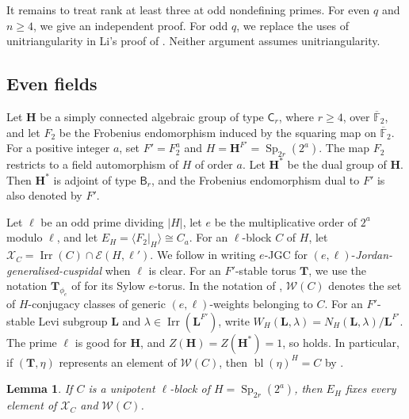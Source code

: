 \documentclass[10pt]{amsart}
\newtheorem{lemma}[theorem]{Lemma}
\theoremstyle{definition}
\renewcommand{\geq}{\geqslant}
\DeclareMathOperator{\Irr}{Irr}
\DeclareMathOperator{\Sp}{Sp}
\DeclareMathOperator{\bl}{bl}
\newcommand{\F}{\mathbb F}
\numberwithin{equation}{section}
\numberwithin{table}{section}
\begin{document}
It remains to treat rank at least three at odd nondefining primes.
For even $q$ and $n\geq4$, we give an independent proof. For odd $q$, we replace the
uses of unitriangularity in Li's proof of \cite[Theorem~2]{Li2021}.
Neither argument assumes unitriangularity.

\subsection{Even fields}

Let $\mathbf H$ be a simply connected algebraic group of type $\mathsf C_r$,
where $r\geq4$, over $\overline{\F}_2$, and let $F_2$ be the Frobenius
endomorphism induced by the squaring map on $\overline{\F}_2$.  For a
positive integer $a$, set $F'=F_2^a$ and
$H=\mathbf H^{F'}=\Sp_{2r}(2^a)$.  The map $F_2$ restricts to a field
automorphism of $H$ of order $a$.  Let $\mathbf H^*$ be the dual group of
$\mathbf H$.  Then $\mathbf H^*$ is adjoint of type $\mathsf B_r$, and the
Frobenius endomorphism dual to $F'$ is also denoted by $F'$.

Let $\ell$ be an odd prime dividing $|H|$, let $e$ be the
multiplicative order of $2^a$ modulo $\ell$, and let
$E_H=\langle F_2|_H\rangle\cong C_a$.  For an $\ell$-block $C$ of $H$, let
$\mathcal X_C=\Irr(C)\cap\mathcal E(H,\ell')$.  We follow
\cite[Definition~3.5]{FengMalleZhang2026} in writing $e$-JGC for
$(e,\ell)$-\emph{Jordan-generalised-cuspidal} when $\ell$ is clear.
For an $F'$-stable torus $\mathbf T$, we use the notation
$\mathbf T_{\phi_e}$ of \cite[Section~3.2]{FengMalleZhang2026} for its
Sylow $e$-torus.  In the notation of
\cite[Definitions~3.17--3.18]{FengMalleZhang2026}, $\mathcal W(C)$ denotes
the set of $H$-conjugacy classes of generic $(e,\ell)$-weights belonging
to $C$.
For an $F'$-stable Levi subgroup $\mathbf L$ and
$\lambda\in\Irr(\mathbf L^{F'})$, write
$W_H(\mathbf L,\lambda)=N_H(\mathbf L,\lambda)/\mathbf L^{F'}$.
The prime $\ell$ is good for $\mathbf H$, and
$Z(\mathbf H)=Z(\mathbf H^*)=1$, so
\cite[Condition~3.23]{FengMalleZhang2026} holds.
In particular, if $(\mathbf T,\eta)$ represents an element of
$\mathcal W(C)$, then $\bl(\eta)^H=C$ by
\cite[Proposition~3.24(b)]{FengMalleZhang2026}.

\begin{lemma}\label{lem:even-field-fixed}
If $C$ is a unipotent $\ell$-block of $H=\Sp_{2r}(2^a)$, then $E_H$
fixes every element of $\mathcal X_C$ and $\mathcal W(C)$.
\end{lemma}
\end{document}
